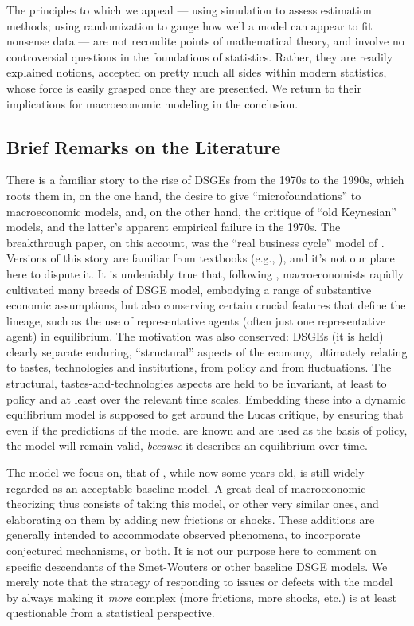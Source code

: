 \documentclass[11pt]{article}
\begin{document}
The principles to which we appeal --- using simulation to assess
estimation methods; using randomization to gauge how well a model can
appear to fit nonsense data --- are not recondite points of mathematical
theory, and involve no controversial questions in the foundations of
statistics. Rather, they are readily explained notions, accepted on
pretty much all sides within modern statistics, whose force is easily
grasped once they are presented. We return to their implications for
macroeconomic modeling in the conclusion.

\hypertarget{brief-remarks-on-the-literature}{%
\subsection{Brief Remarks on the
Literature}\label{brief-remarks-on-the-literature}}

There is a familiar story to the rise of DSGEs from the 1970s to the
1990s, which roots them in, on the one hand, the desire to give
``microfoundations'' to macroeconomic models, and, on the other hand,
the \citet{Lucas1976} critique of ``old Keynesian'' models, and the
latter's apparent empirical failure in the 1970s. The breakthrough
paper, on this account, was the ``real business cycle'' model of
\citet{KydlandPrescott1982}. Versions of this story are familiar from
textbooks (e.g., \citealt{DeJongDave2007}), and it's not our place here
to dispute it. It is undeniably true that, following
\citet{KydlandPrescott1982}, macroeconomists rapidly cultivated many
breeds of DSGE model, embodying a range of substantive economic
assumptions, but also conserving certain crucial features that define
the lineage, such as the use of representative agents (often just one
representative agent) in equilibrium. The motivation was also conserved:
DSGEs (it is held) clearly separate enduring, ``structural'' aspects of
the economy, ultimately relating to tastes, technologies and
institutions, from policy and from fluctuations. The structural,
tastes-and-technologies aspects are held to be invariant, at least to
policy and at least over the relevant time scales. Embedding these into
a dynamic equilibrium model is supposed to get around the Lucas
critique, by ensuring that even if the predictions of the model are
known and are used as the basis of policy, the model will remain valid,
\emph{because} it describes an equilibrium over time.

The model we focus on, that of \citet{SmetsWouters2007}, while now some
years old, is still widely regarded as an acceptable baseline model. A
great deal of macroeconomic theorizing thus consists of taking this
model, or other very similar ones, and elaborating on them by adding new
frictions or shocks. These additions are generally intended to
accommodate observed phenomena, to incorporate conjectured mechanisms,
or both. It is not our purpose here to comment on specific descendants
of the Smet-Wouters or other baseline DSGE models. We merely note that
the strategy of responding to issues or defects with the model by always
making it \emph{more} complex (more frictions, more shocks, etc.) is at
least questionable from a statistical perspective.
\end{document}
